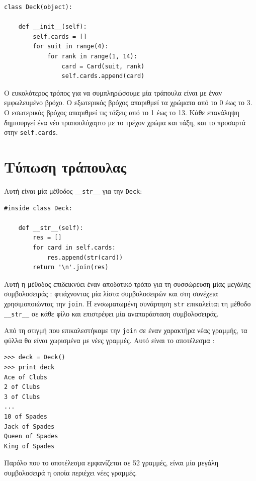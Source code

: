 \documentclass[10pt]{book}
\begin{document}
\begin{verbatim}
class Deck(object):

    def __init__(self):
        self.cards = []
        for suit in range(4):
            for rank in range(1, 14):
                card = Card(suit, rank)
                self.cards.append(card)
\end{verbatim}
%
 Ο ευκολότερος τρόπος για να συμπληρώσουμε μία τράπουλα είναι με έναν εμφωλευμένο 
βρόχο.  Ο εξωτερικός βρόχος απαριθμεί τα χρώματα από το 0 έως το 3.  Ο εσωτερικός βρόχος 
απαριθμεί τις τάξεις από το 1 έως το 13.  Κάθε επανάληψη δημιουργεί ένα νέο τραπουλόχαρτο 
με το τρέχον χρώμα και τάξη, και το προσαρτά στην  {\tt self.cards}.


 
\section{Τύπωση τράπουλας}
\label{printdeck}

Αυτή είναι μία μέθοδος  \verb"__str__"  για την  {\tt Deck}:

\begin{verbatim}
#inside class Deck:

    def __str__(self):
        res = []
        for card in self.cards:
            res.append(str(card))
        return '\n'.join(res)
\end{verbatim}
%
 Αυτή η μέθοδος επιδεικνύει έναν αποδοτικό τρόπο για τη συσσώρευση μίας μεγάλης 
συμβολοσειράς :  φτιάχνοντας μία λίστα συμβολοσειρών και στη συνέχεια χρησιμοποιώντας την  {\tt join}.   Η ενσωματωμένη συνάρτηση  {\tt str}  επικαλείται τη μέθοδο  \verb"__str__"  σε κάθε φίλο και επιστρέφει μία αναπαράσταση 
συμβολοσειράς. 

Από τη στιγμή που επικαλεστήκαμε την  {\tt join}  σε έναν χαρακτήρα νέας γραμμής, τα 
φύλλα θα είναι χωρισμένα με νέες γραμμές.  Αυτό είναι το αποτέλεσμα : 

\begin{verbatim}
>>> deck = Deck()
>>> print deck
Ace of Clubs
2 of Clubs
3 of Clubs
...
10 of Spades
Jack of Spades
Queen of Spades
King of Spades
\end{verbatim}
%
 Παρόλο που το αποτέλεσμα εμφανίζεται σε 52 γραμμές, είναι μία μεγάλη συμβολοσειρά 
η οποία περιέχει νέες γραμμές.
\end{document}
